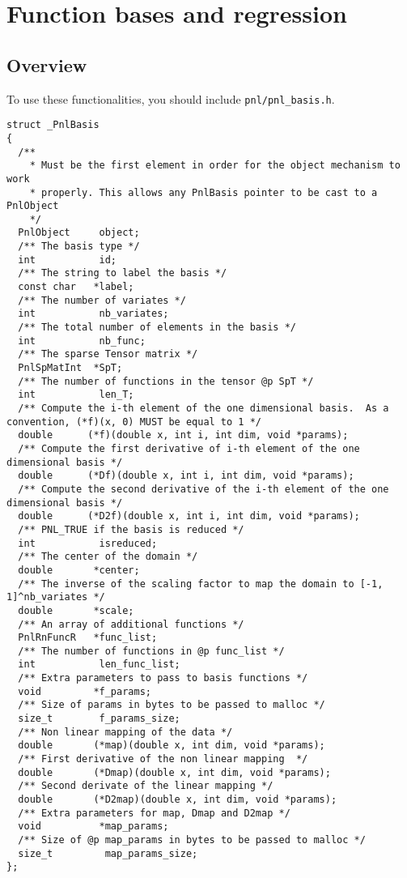 \section{Function bases and regression}
\subsection{Overview}

To use these functionalities, you should include \verb!pnl/pnl_basis.h!.

\begin{lstlisting}
struct _PnlBasis
{
  /**
    * Must be the first element in order for the object mechanism to work
    * properly. This allows any PnlBasis pointer to be cast to a PnlObject
    */
  PnlObject     object;
  /** The basis type */
  int           id;
  /** The string to label the basis */
  const char   *label;
  /** The number of variates */
  int           nb_variates;
  /** The total number of elements in the basis */
  int           nb_func;
  /** The sparse Tensor matrix */
  PnlSpMatInt  *SpT;
  /** The number of functions in the tensor @p SpT */
  int           len_T;
  /** Compute the i-th element of the one dimensional basis.  As a convention, (*f)(x, 0) MUST be equal to 1 */
  double      (*f)(double x, int i, int dim, void *params);
  /** Compute the first derivative of i-th element of the one dimensional basis */
  double      (*Df)(double x, int i, int dim, void *params);
  /** Compute the second derivative of the i-th element of the one dimensional basis */
  double      (*D2f)(double x, int i, int dim, void *params);
  /** PNL_TRUE if the basis is reduced */
  int           isreduced;
  /** The center of the domain */
  double       *center;
  /** The inverse of the scaling factor to map the domain to [-1, 1]^nb_variates */
  double       *scale;
  /** An array of additional functions */
  PnlRnFuncR   *func_list;
  /** The number of functions in @p func_list */
  int           len_func_list;
  /** Extra parameters to pass to basis functions */
  void         *f_params;
  /** Size of params in bytes to be passed to malloc */
  size_t        f_params_size;
  /** Non linear mapping of the data */
  double       (*map)(double x, int dim, void *params);
  /** First derivative of the non linear mapping  */
  double       (*Dmap)(double x, int dim, void *params);
  /** Second derivate of the linear mapping */
  double       (*D2map)(double x, int dim, void *params);
  /** Extra parameters for map, Dmap and D2map */
  void          *map_params;
  /** Size of @p map_params in bytes to be passed to malloc */
  size_t         map_params_size;
};
\end{lstlisting}

